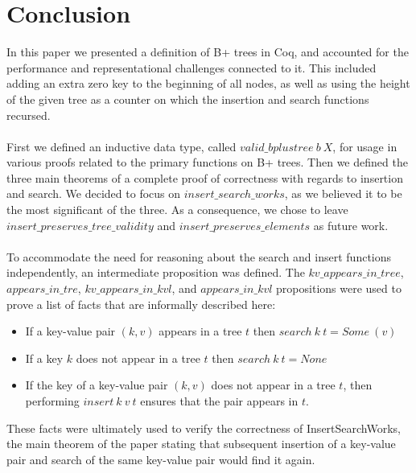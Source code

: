 \section{Conclusion}
\label{sec:Conclusion}
In this paper we presented a definition of B+ trees in Coq, and accounted for the performance and representational challenges connected to it. This included adding an extra zero key to the beginning of all nodes, as well as using the height of the given tree as a counter on which the insertion and search functions recursed. 
\paragraph{}
First we defined an inductive data type, called $valid\_bplustree~b~X$, for usage in various proofs related to the primary functions on B+ trees. Then we defined the three main theorems of a complete proof of correctness with regards to insertion and search. We decided to focus on $insert\_search\_works$, as we believed it to be the most significant of the three. As a consequence, we chose to leave $insert\_preserves\_tree\_validity$ and $insert\_preserves\_elements$ as future work.
\paragraph{}
To accommodate the need for reasoning about the search and insert functions independently, an intermediate proposition was defined. The $kv\_appears\_in\_tree$, $appears\_in\_tre$, $kv\_appears\_in\_kvl$, and $appears\_in\_kvl$ propositions were used to prove a list of facts that are informally described here:

\begin{itemize}
	\item If a key-value pair $(k, v)$ appears in a tree $t$ then $search~k~t = Some~(v)$
	\item If a key $k$ does not appear in a tree $t$ then $search~k~t = None$
	\item If the key of a key-value pair $(k, v)$ does not appear in a tree $t$, then performing $insert~k~v~t$ ensures that the pair appears in $t$.
\end{itemize} 

These facts were ultimately used to verify the correctness of InsertSearchWorks, the main theorem of the paper stating that subsequent insertion of a key-value pair and search of the same key-value pair would find it again.
